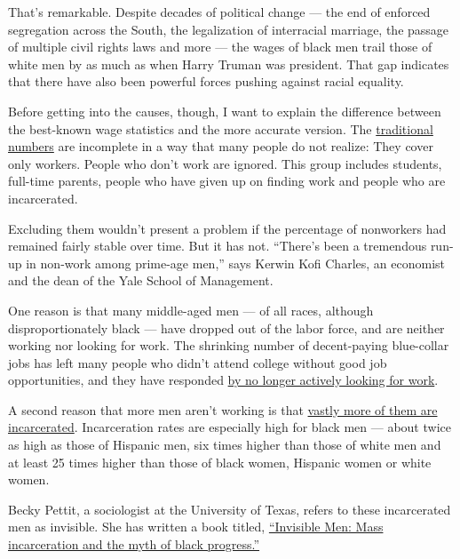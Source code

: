 That's remarkable. Despite decades of political change --- the end of
enforced segregation across the South, the legalization of interracial
marriage, the passage of multiple civil rights laws and more --- the
wages of black men trail those of white men by as much as when Harry
Truman was president. That gap indicates that there have also been
powerful forces pushing against racial equality.

Before getting into the causes, though, I want to explain the difference
between the best-known wage statistics and the more accurate version.
The
\href{https://web.archive.org/web/20110607035101/http://www.gpoaccess.gov/eop/ca/pdfs/ch4.pdf}{traditional
numbers} are incomplete in a way that many people do not realize: They
cover only workers. People who don't work are ignored. This group
includes students, full-time parents, people who have given up on
finding work and people who are incarcerated.

Excluding them wouldn't present a problem if the percentage of
nonworkers had remained fairly stable over time. But it has not.
``There's been a tremendous run-up in non-work among prime-age men,''
says Kerwin Kofi Charles, an economist and the dean of the Yale School
of Management.

One reason is that many middle-aged men --- of all races, although
disproportionately black --- have dropped out of the labor force, and
are neither working nor looking for work. The shrinking number of
decent-paying blue-collar jobs has left many people who didn't attend
college without good job opportunities, and they have responded
\href{https://obamawhitehouse.archives.gov/sites/default/files/page/files/20160620_cea_primeage_male_lfp.pdf}{by
no longer actively looking for work}.

A second reason that more men aren't working is that
\href{https://sentencingproject.org/wp-content/uploads/2016/01/Trends-in-US-Corrections.pdf}{vastly
more of them are incarcerated}. Incarceration rates are especially high
for black men --- about twice as high as those of Hispanic men, six
times higher than those of white men and at least 25 times higher than
those of black women, Hispanic women or white women.

Becky Pettit, a sociologist at the University of Texas, refers to these
incarcerated men as invisible. She has written a book titled,
\href{https://www.russellsage.org/publications/invisible-men}{``Invisible
Men: Mass incarceration and the myth of black progress.''}

